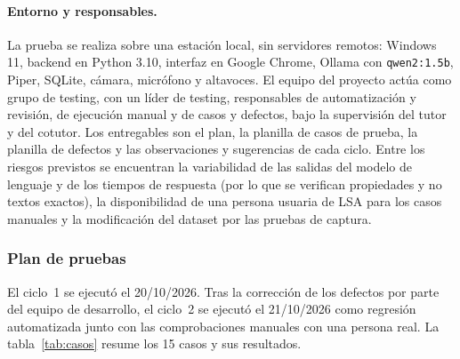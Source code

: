 \paragraph{Entorno y responsables.} La prueba se realiza sobre una estación local, sin servidores remotos: Windows 11, backend en Python 3.10, interfaz en Google Chrome, Ollama con \texttt{qwen2:1.5b}, Piper, SQLite, cámara, micrófono y altavoces. El equipo del proyecto actúa como grupo de testing, con un líder de testing, responsables de automatización y revisión, de ejecución manual y de casos y defectos, bajo la supervisión del tutor y del cotutor. Los entregables son el plan, la planilla de casos de prueba, la planilla de defectos y las observaciones y sugerencias de cada ciclo. Entre los riesgos previstos se encuentran la variabilidad de las salidas del modelo de lenguaje y de los tiempos de respuesta (por lo que se verifican propiedades y no textos exactos), la disponibilidad de una persona usuaria de LSA para los casos manuales y la modificación del dataset por las pruebas de captura.

\subsubsection{Plan de pruebas}\label{sec:pruebas-plan}

El ciclo~1 se ejecutó el 20/10/2026. Tras la corrección de los defectos por parte del equipo de desarrollo, el ciclo~2 se ejecutó el 21/10/2026 como regresión automatizada junto con las comprobaciones manuales con una persona real. La tabla~\ref{tab:casos} resume los 15 casos y sus resultados.

